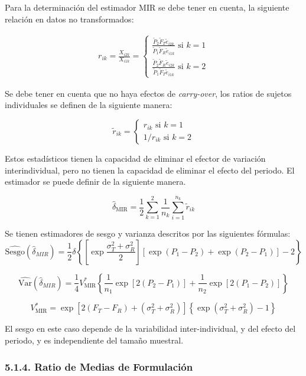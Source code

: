 \documentclass[]{article}
\begin{document}
Para la determinación del estimador MIR se debe tener en cuenta, la
siguiente relación en datos no transformados:

\[
\begin{aligned}
r_{ik} = \frac{X_{i2k}}{X_{i1k}} = \left\{\begin{matrix}\frac{\tilde{P}_{2}\tilde{F}_{T}\tilde{e}_{i2k}}{\tilde{P}_{1}\tilde{F}_{R}\tilde{e}_{i1k}}  \textrm{ si } k = 1\\\frac{\tilde{P}_{2}\tilde{F}_{R}\tilde{e}_{i2k}}{\tilde{P}_{1}\tilde{F}_{T}\tilde{e}_{i1k}}  \textrm{ si } k = 2\end{matrix}\right.
\end{aligned}
\]

Se debe tener en cuenta que no haya efectos de \emph{carry-over}, los
ratios de sujetos individuales se definen de la siguiente manera:

\[
\tilde{r}_{ik} = \left\{\begin{matrix}{r}_{ik}\textrm{ si }k=1\\1/{r}_{ik} \textrm{ si } k=2\end{matrix}\right.
\]

Estos estadísticos tienen la capacidad de eliminar el efector de
variación interindividual, pero no tienen la capacidad de eliminar el
efecto del periodo. El estimador se puede definir de la siguiente
manera.

\[
\hat{\delta}_{\textrm{MIR}}=\frac{1}{2}\sum_{k=1}^{2}\frac{1}{n_{k}}\sum_{i=1}^{n_{k}}{\tilde{r}_{ik}}
\]

Se tienen estimadores de sesgo y varianza descritos por las siguientes
fórmulas: \[
\hat{\textrm{Sesgo}}(\hat{\delta}_{MIR}) = \frac{1}{2}\delta\left\{\left[\exp{\frac{\sigma_{T}^2+\sigma_{R}^2}{2}}\right]\left[\exp{(P_{1}-P_{2})}+\exp{(P_{2}-P_{1})}\right]-2
\right\}
\]

\[
\hat{\textrm{Var}}(\hat{\delta}_{MIR})=\frac{1}{4}V_{\textrm{MIR}}^{*}\left\{\frac{1}{n_{1}}\exp{\left[2(P_{2}-P_{1})\right]}+\frac{1}{n_{2}}\exp{\left[2(P_{1}-P_{2})\right]}\right\}
\]

\[
V_{\textrm{MIR}}^{*}=\exp{\left[2\left(F_{T}-F_{R}\right)+\left(\sigma_{T}^{2}+\sigma_{R}^{2}\right)\right]}\left\{\exp{\left(\sigma_{T}^{2}+\sigma_{R}^{2}\right)}-1\right\}
\]

El sesgo en este caso depende de la variabilidad inter-individual, y del
efecto del periodo, y es independiente del tamaño muestral.

\subsubsection{5.1.4. Ratio de Medias de
Formulación}\label{ratio-de-medias-de-formulacion}
\end{document}
